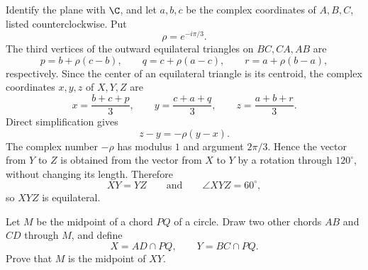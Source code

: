    \begin{solution}
        Identify the plane with $\C$, and let $a,b,c$ be the complex
        coordinates of $A,B,C$, listed counterclockwise. Put
        \[
            \rho=e^{-i\pi/3}.
        \]
        The third vertices of the outward equilateral triangles on
        $BC,CA,AB$ are
        \[
            p=b+\rho(c-b),
            \qquad
            q=c+\rho(a-c),
            \qquad
            r=a+\rho(b-a),
        \]
        respectively. Since the center of an equilateral triangle is its
        centroid, the complex coordinates $x,y,z$ of $X,Y,Z$ are
        \[
            x=\frac{b+c+p}{3},
            \qquad
            y=\frac{c+a+q}{3},
            \qquad
            z=\frac{a+b+r}{3}.
        \]
        Direct simplification gives
        \[
            z-y=-\rho(y-x).
        \]
        The complex number $-\rho$ has modulus $1$ and argument $2\pi/3$.
        Hence the vector from $Y$ to $Z$ is obtained from the vector from $X$
        to $Y$ by a rotation through $120^\circ$, without changing its length.
        Therefore
        \[
            XY=YZ
            \qquad\text{and}\qquad
            \angle XYZ=60^\circ,
        \]
        so $XYZ$ is equilateral.
    \end{solution}

    \begin{expectedproblem}
        Let $M$ be the midpoint of a chord $PQ$ of a circle. Draw two other
        chords $AB$ and $CD$ through $M$, and define
        \[
            X=AD\cap PQ,
            \qquad
            Y=BC\cap PQ.
        \]
        Prove that $M$ is the midpoint of $XY$.
    \end{expectedproblem}

